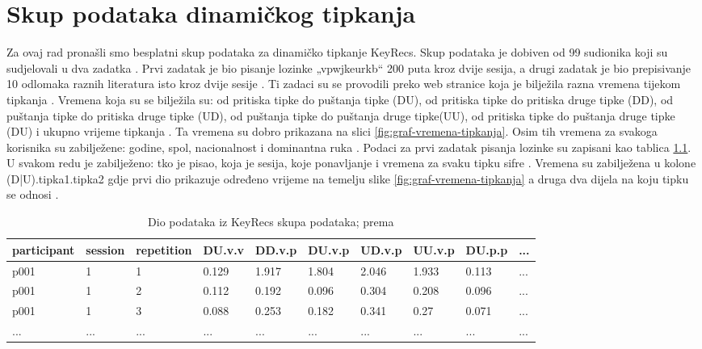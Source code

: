 \documentclass[]{foi}
\begin{document}
\chapter{Skup podataka dinamičkog tipkanja}
Za ovaj rad pronašli smo besplatni skup podataka za dinamičko tipkanje KeyRecs. Skup podataka je dobiven od 99 sudionika koji su sudjelovali u dva zadatka  \cite{Dias2023}. Prvi zadatak je bio pisanje lozinke „vpwjkeurkb“ 200 puta kroz dvije sesija, a drugi zadatak je bio prepisivanje 10 odlomaka raznih literatura isto kroz dvije sesije \cite{Dias2023}. Ti zadaci su se provodili preko web stranice koja je bilježila razna vremena tijekom tipkanja \cite{Dias2023}. Vremena koja su se bilježila su: od pritiska tipke do puštanja tipke (DU), od pritiska tipke do pritiska druge tipke (DD), od puštanja tipke do pritiska druge tipke (UD), od puštanja tipke do puštanja druge tipke(UU), od pritiska tipke do puštanja druge tipke (DU) i ukupno vrijeme tipkanja \cite{Dias2023}. Ta vremena su dobro prikazana na slici \ref{fig:graf-vremena-tipkanja}. Osim tih vremena za svakoga korisnika su  zabilježene: godine, spol, nacionalnost i dominantna ruka  \cite{Dias2023}. Podaci za prvi zadatak pisanja lozinke su zapisani kao tablica \ref{tab:KeyRecs-podaci}. U svakom redu je zabilježeno: tko je pisao, koja je sesija, koje ponavljanje i vremena za svaku tipku sifre \cite{Dias2023}. Vremena su zabilježena u kolone (D|U).tipka1.tipka2 gdje prvi dio prikazuje određeno vrijeme na temelju slike \ref{fig:graf-vremena-tipkanja} a druga dva dijela na koju tipku se odnosi \cite{Dias2023}.

\begin{table}[!h]
    \centering
    \caption{Dio podataka iz KeyRecs skupa podataka; prema \cite{Dias2023}}
    \begin{tabularx}{1\textwidth}{|l|l|l|l|l|l|l|l|l|l|}
    \hline
        \cellcolor{gray!25}participant & \cellcolor{gray!25}session & \cellcolor{gray!25}repetition & \cellcolor{gray!25}DU.v.v & \cellcolor{gray!25}DD.v.p & \cellcolor{gray!25}DU.v.p & \cellcolor{gray!25}UD.v.p & \cellcolor{gray!25}UU.v.p & \cellcolor{gray!25}DU.p.p & \cellcolor{gray!25}... \\ \hline
        p001 & 1 & 1 & 0.129 & 1.917 & 1.804 & 2.046 & 1.933 & 0.113 & ... \\ \hline
        p001 & 1 & 2 & 0.112 & 0.192 & 0.096 & 0.304 & 0.208 & 0.096 & ... \\ \hline
        p001 & 1 & 3 & 0.088 & 0.253 & 0.182 & 0.341 & 0.27 & 0.071 & ... \\ \hline
        ... & ... & ... & ... & ... & ... & ... & ... & ... & ... \\ \hline
    \end{tabularx}
    \\[10pt]
    \label{tab:KeyRecs-podaci}
\end{table}
\end{document}
